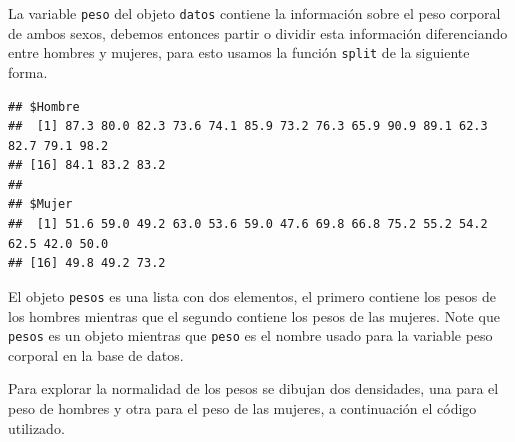 \documentclass[
]{book}
\makeatletter
\newenvironment{Shaded}{\begin{snugshade}}{\end{snugshade}}
\newcommand{\CommentTok}[1]{\textcolor[rgb]{0.56,0.35,0.01}{\textit{#1}}}
\newcommand{\FunctionTok}[1]{\textcolor[rgb]{0.00,0.00,0.00}{#1}}
\newcommand{\NormalTok}[1]{#1}
\newcommand{\OtherTok}[1]{\textcolor[rgb]{0.56,0.35,0.01}{#1}}
\newcommand{\SpecialCharTok}[1]{\textcolor[rgb]{0.00,0.00,0.00}{#1}}
\newenvironment{kframe}{%
\medskip{}
\setlength{\fboxsep}{.8em}
 \def\at@end@of@kframe{}%
 \ifinner\ifhmode%
  \def\at@end@of@kframe{\end{minipage}}%
  \begin{minipage}{\columnwidth}%
 \fi\fi%
 \def\FrameCommand##1{\hskip\@totalleftmargin \hskip-\fboxsep
 \colorbox{shadecolor}{##1}\hskip-\fboxsep
     \hskip-\linewidth \hskip-\@totalleftmargin \hskip\columnwidth}%
 \MakeFramed {\advance\hsize-\width
   \@totalleftmargin\z@ \linewidth\hsize
   \@setminipage}}%
 {\par\unskip\endMakeFramed%
 \at@end@of@kframe}
\renewenvironment{Shaded}{\begin{kframe}}{\end{kframe}}
\makeatother
\begin{document}
La variable \texttt{peso} del objeto \texttt{datos} contiene la información sobre el peso corporal de ambos sexos, debemos entonces partir o dividir esta información diferenciando entre hombres y mujeres, para esto usamos la función \texttt{split} de la siguiente forma.

\begin{Shaded}
\end{Shaded}

\begin{verbatim}
## $Hombre
##  [1] 87.3 80.0 82.3 73.6 74.1 85.9 73.2 76.3 65.9 90.9 89.1 62.3 82.7 79.1 98.2
## [16] 84.1 83.2 83.2
## 
## $Mujer
##  [1] 51.6 59.0 49.2 63.0 53.6 59.0 47.6 69.8 66.8 75.2 55.2 54.2 62.5 42.0 50.0
## [16] 49.8 49.2 73.2
\end{verbatim}

El objeto \texttt{pesos} es una lista con dos elementos, el primero contiene los pesos de los hombres mientras que el segundo contiene los pesos de las mujeres. Note que \texttt{pesos} es un objeto mientras que \texttt{peso} es el nombre usado para la variable peso corporal en la base de datos.

Para explorar la normalidad de los pesos se dibujan dos densidades, una para el peso de hombres y otra para el peso de las mujeres, a continuación el código utilizado.
\end{document}

